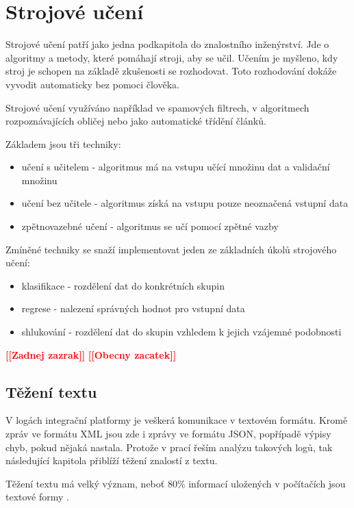 \documentclass[thesis=M,czech]{FITthesis}[2012/10/20]
\newcommand{\todo}[1]{\textcolor{red}{\textbf{[[#1]]}}}
\begin{document}
	\section{Strojové učení}
		Strojové učení patří jako jedna podkapitola do znalostního inženýrství. Jde o algoritmy a metody, které pomáhají stroji, aby se učil. Učením je myšleno, kdy stroj je schopen na základě zkušenosti se rozhodovat. Toto rozhodování dokáže vyvodit automaticky bez pomoci člověka. \cite{what-is-machine-learning}
		
		Strojové učení využíváno například ve spamových filtrech, v algoritmech rozpoznávajících obličej nebo jako automatické třídění článků.
		
		Základem jsou tři techniky:
		
			\begin{itemize} 
				\item učení s učitelem - algoritmus má na vstupu učící množinu dat a validační množinu
				\item učení bez učitele - algoritmus získá na vstupu pouze neoznačená vstupní data
				\item zpětnovazebné učení - algoritmus se učí pomocí zpětné vazby	
			\end{itemize}
		
		Zmíněné techniky se snaží implementovat jeden ze základních úkolů strojového učení:
			\begin{itemize} 
				\item klasifikace - rozdělení dat do konkrétních skupin
				\item regrese - nalezení správných hodnot pro vstupní data
				\item shlukování - rozdělení dat do skupin vzhledem k jejich vzájemné podobnosti
			\end{itemize}
		
		
		\todo{Zadnej zazrak} \cite{machine-learning}
		\todo{Obecny zacatek} \cite{machin-learning-and-opt}
		
	\subsection{Těžení textu}
		V logách integrační platformy je veškerá komunikace v textovém formátu. Kromě zpráv ve formátu XML jsou zde i zprávy ve formátu JSON, popřípadě výpisy chyb, pokud nějaká nastala. Protože v prací řeším analýzu takových logů, tak následující kapitola přiblíží těžení znalostí z textu. 
		
		Těžení textu má velký význam, neboť 80\% informací uložených v počítačích jsou textové formy \cite{IRWebTechniques}.
		
\end{document}

